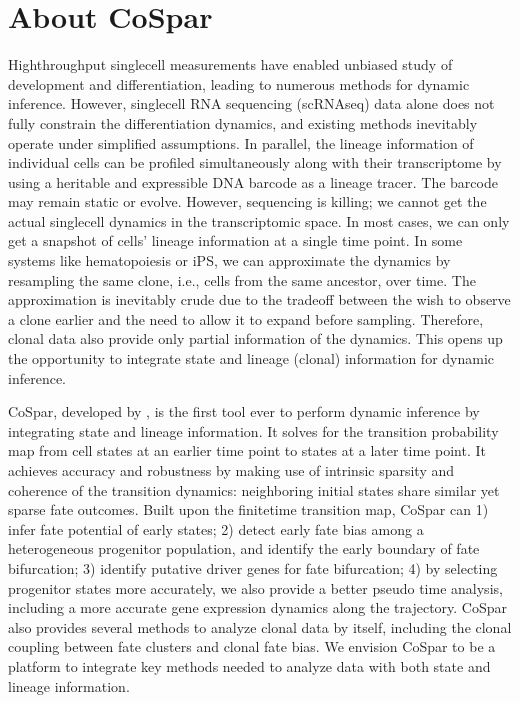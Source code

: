\documentclass[letterpaper,10pt,english]{sphinxmanual}
\begin{document}
\section{About CoSpar}
\label{\detokenize{about:about-cospar}}\label{\detokenize{about::doc}}
High\sphinxhyphen{}throughput single\sphinxhyphen{}cell measurements have enabled unbiased study of development and differentiation, leading to numerous methods for dynamic inference. However, single\sphinxhyphen{}cell RNA sequencing (scRNA\sphinxhyphen{}seq) data alone does not fully constrain the differentiation dynamics, and existing methods inevitably operate under simplified assumptions. In parallel, the lineage information of individual cells can be profiled simultaneously along with their transcriptome by using a heritable and expressible DNA barcode as a lineage tracer. The barcode may remain static or evolve. However, sequencing is killing; we cannot get the actual single\sphinxhyphen{}cell dynamics in the transcriptomic space. In most cases, we can only get a snapshot of cells’ lineage information at a single time point. In some  systems like hematopoiesis or iPS, we can approximate the dynamics by re\sphinxhyphen{}sampling the same clone, i.e., cells from the same ancestor, over time. The approximation is inevitably crude due to the tradeoff between the wish to observe a clone earlier and the need to allow it to expand before sampling. Therefore, clonal data also provide only partial information of the dynamics. This opens up the opportunity to integrate state and lineage (clonal) information for dynamic inference.

CoSpar, developed by , is the first tool ever to perform dynamic inference by integrating state and lineage information. It solves for the transition probability map from cell states at an earlier time point to states at a later time point. It achieves accuracy and robustness by making use of intrinsic sparsity and coherence of the transition dynamics: neighboring initial states share similar yet sparse fate outcomes. Built upon the finite\sphinxhyphen{}time transition map, CoSpar can 1) infer fate potential of early states; 2) detect early fate bias among a heterogeneous progenitor population, and identify the early boundary of fate bifurcation; 3) identify putative driver genes for fate bifurcation; 4) by selecting progenitor states more accurately, we also provide a better pseudo time analysis, including a more accurate gene expression dynamics along the trajectory. CoSpar also provides several methods to analyze clonal data by itself, including the clonal coupling between fate clusters and clonal fate bias.  We envision CoSpar to be a platform to integrate key methods needed to analyze data with both state and lineage information.
\end{document}
